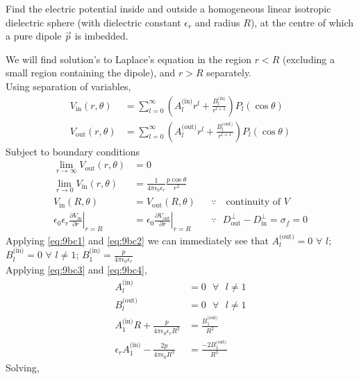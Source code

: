 \documentclass[../main.tex]{subfiles}
\begin{document}
\begin{questions}
\question Find the electric potential inside and outside a homogeneous linear isotropic dielectric sphere (with dielectric constant $\epsilon_r$ and radius $R$), at the centre of which a pure dipole $\vec{p}$ is imbedded.
\begin{solution}
	We will find solution's to Laplace's equation in the region $r < R$ (excluding a small region containing the dipole), and $r>R$ separately.\\ Using separation of variables,
	\begin{align}
		V_\text{in}(r,\theta) &= \sum_{l=0}^{\infty} \left(A^\text{(in)}_lr^l+\frac{B^\text{(in)}_l}{r^{l+1}}\right)P_l(\cos\theta)\\
		V_\text{out}(r,\theta) &= \sum_{l=0}^{\infty} \left(A^\text{(out)}_lr^l+\frac{B^\text{(out)}_l}{r^{l+1}}\right)P_l(\cos\theta)
	\end{align}
	Subject to boundary conditions
	\begin{align}
		\lim_{r\to\infty}V_\text{out}(r,\theta) &= 0\label{eq:9bc1}
		\\
		\lim_{r\to0}V_\text{in}(r,\theta) &= \frac{1}{4\pi\epsilon_0\epsilon_r} \frac{p\cos\theta}{r^2}\label{eq:9bc2}
		\\
		V_\text{in}(R,\theta) &= V_\text{out}(R,\theta)\label{eq:9bc3} && \text{$\because \text{ }$ continuity of $V$}
		\\
		\epsilon_0\epsilon_r\left.\frac{\partial V_\text{in}}{\partial r}\right|_{r=R} &= \epsilon_0\left.\frac{\partial V_\text{out}}{\partial r}\right|_{r=R}  && \because \text{ } D^{\perp}_\text{out} - D^{\perp}_\text{in} = \sigma_f = 0 \label{eq:9bc4}
	\end{align}
	Applying \eqref{eq:9bc1} and \eqref{eq:9bc2} we can immediately see that $A^\text{(out)}_l=0$ $\forall$ $l$; $B^\text{(in)}_l=0$ $\forall$ $l\neq1$; $B^\text{(in)}_1 = \frac{p}{4\pi\epsilon_0\epsilon_r}$\\
	Applying \eqref{eq:9bc3} and \eqref{eq:9bc4},
	\begin{align}
		A^\text{(in)}_l &= 0 \text{ } \forall \text{ } l \neq 1\\
		B^\text{(out)}_l &= 0 \text{ } \forall \text{ } l \neq 1\\
		A_1^\text{(in)}R+\frac{p}{4\pi\epsilon_0\epsilon_rR^2} &= \frac{B_1^\text{(out)}}{R^2}\\
		\epsilon_rA_1^\text{(in)} - \frac{2p}{4\pi\epsilon_0R^3} &= \frac{-2B_1^\text{(out)}}{R^3}
	\end{align}
	Solving,
	\begin{align}

\end{align}
\end{solution}
\end{questions}
\end{document}
